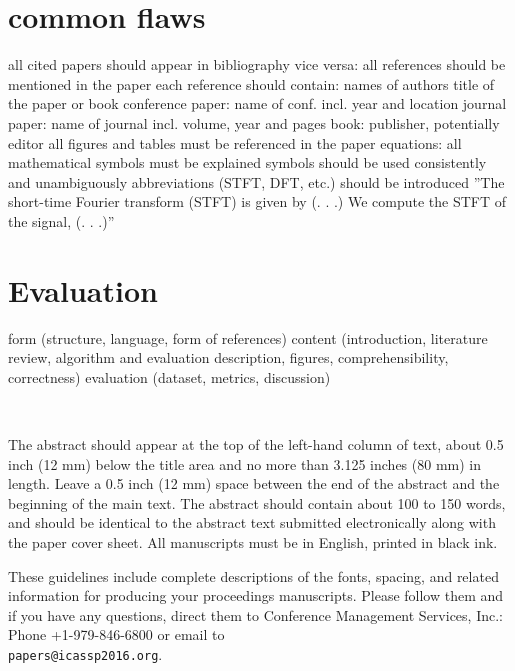 \documentclass{article}
\begin{document}



\vfill\pagebreak

\section{common flaws}
all cited papers should appear in bibliography
vice versa: all references should be mentioned in the paper
each reference should contain:
names of authors
title of the paper or book
conference paper: name of conf. incl. year and location
journal paper: name of journal incl. volume, year and pages
book: publisher, potentially editor
all figures and tables must be referenced in the paper
equations:
all mathematical symbols must be explained
symbols should be used consistently and unambiguously
abbreviations (STFT, DFT, etc.) should be introduced
”The short-time Fourier transform (STFT) is given by (. . .)
We compute the STFT of the signal, (. . .)”

\section{Evaluation}

form (structure, language, form of references)
content (introduction, literature review, algorithm and
evaluation description, figures, comprehensibility, correctness)
evaluation (dataset, metrics, discussion)

\vfill\pagebreak
~
\vfill\pagebreak


The abstract should appear at the top of the left-hand column of text, about
0.5 inch (12 mm) below the title area and no more than 3.125 inches (80 mm) in
length.  Leave a 0.5 inch (12 mm) space between the end of the abstract and the
beginning of the main text.  The abstract should contain about 100 to 150
words, and should be identical to the abstract text submitted electronically
along with the paper cover sheet.  All manuscripts must be in English, printed
in black ink.


These guidelines include complete descriptions of the fonts, spacing, and
related information for producing your proceedings manuscripts. Please follow
them and if you have any questions, direct them to Conference Management
Services, Inc.: Phone +1-979-846-6800 or email
to \\\texttt{papers@icassp2016.org}.
\end{document}
